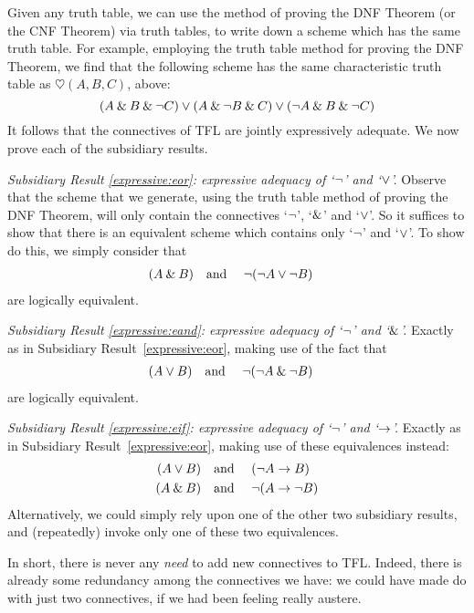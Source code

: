 Given any truth table, we can use the method of proving the DNF Theorem (or the CNF Theorem) via truth tables, to write down a scheme which has the same truth table. For example, employing the truth table method for proving the DNF Theorem, we find that the following scheme has the same characteristic truth table as $\heartsuit(A,B,C)$, above:
		$$(A \mathbin{\&} B \mathbin{\&} \neg C) \vee (A \mathbin{\&} \neg B \mathbin{\&} C) \vee (\neg A \mathbin{\&} B \mathbin{\&} \neg C)$$
It follows that the connectives of TFL are jointly expressively adequate. We now prove each of the subsidiary results.

\emph{Subsidiary Result \ref{expressive:eor}: expressive adequacy of `$\neg$' and `$\vee$'.} Observe that the scheme that we generate, using the truth table method of proving the DNF Theorem, will only contain the connectives `$\neg$', `$\mathbin{\&}$' and `$\vee$'. So it suffices to show that there is an equivalent scheme which contains only `$\neg$' and `$\vee$'. To show do this, we simply consider that
		\begin{align*}
		(A \mathbin{\&} B) & \text{\quad and \quad} \neg(\neg A \vee\neg B)
		\end{align*}
		are logically equivalent.

\emph{Subsidiary Result \ref{expressive:eand}: expressive adequacy of `$\neg$' and `$\mathbin{\&}$'.} Exactly as in Subsidiary Result~\ref{expressive:eor}, making use of the fact that
		\begin{align*}
		(A \vee B) & \text{\quad and \quad}\neg(\neg A \mathbin{\&}\neg B)
		\end{align*}
are logically equivalent.

\emph{Subsidiary Result \ref{expressive:eif}: expressive adequacy of `$\neg$' and `$\rightarrow$'.} Exactly as in Subsidiary Result~\ref{expressive:eor}, making use of these equivalences instead:
		\begin{align*}
		(A \vee B) &\text{\quad and \quad} (\neg A \rightarrow B)\\
		(A \mathbin{\&} B) &\text{\quad and \quad} \neg(A \rightarrow \neg B)
		\end{align*}
Alternatively, we could simply rely upon one of the other two subsidiary results, and (repeatedly) invoke only one of these two equivalences.

In short, there is never any \emph{need} to add new connectives to TFL. Indeed, there is already some redundancy among the connectives we have: we could have made do with just two connectives, if we had been feeling really austere.

